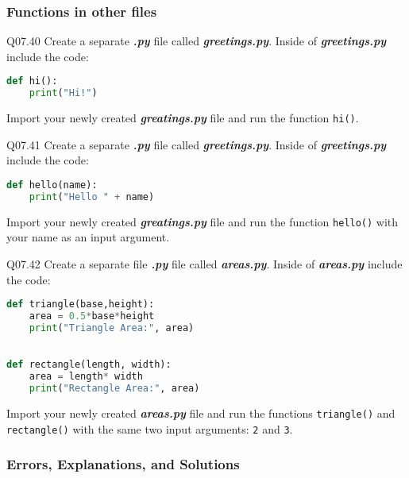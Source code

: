 \documentclass{book}
\newenvironment{problems}{}{}  %
\newcommand{\passthrough}[1]{#1}
\begin{document}
    
        \begin{problems}
        \hypertarget{functions-in-other-files}{%
\subsubsection{Functions in other
files}\label{functions-in-other-files}}

Q07.40 Create a separate \textbf{\emph{.py}} file called
\textbf{\emph{greetings.py}}. Inside of \textbf{\emph{greetings.py}}
include the code:

\begin{lstlisting}[language=Python]
def hi():
    print("Hi!")
\end{lstlisting}

Import your newly created \textbf{\emph{greatings.py}} file and run the
function \passthrough{\lstinline!hi()!}.

Q07.41 Create a separate \textbf{\emph{.py}} file called
\textbf{\emph{greetings.py}}. Inside of \textbf{\emph{greetings.py}}
include the code:

\begin{lstlisting}[language=Python]
def hello(name):
    print("Hello " + name)
\end{lstlisting}

Import your newly created \textbf{\emph{greatings.py}} file and run the
function \passthrough{\lstinline!hello()!} with your name as an input
argument.

Q07.42 Create a separate file \textbf{\emph{.py}} file called
\textbf{\emph{areas.py}}. Inside of \textbf{\emph{areas.py}} include the
code:

\begin{lstlisting}[language=Python]
def triangle(base,height):
    area = 0.5*base*height
    print("Triangle Area:", area)
    

def rectangle(length, width):
    area = length* width
    print("Rectangle Area:", area)
\end{lstlisting}

Import your newly created \textbf{\emph{areas.py}} file and run the
functions \passthrough{\lstinline!triangle()!} and
\passthrough{\lstinline!rectangle()!} with the same two input arguments:
\passthrough{\lstinline!2!} and \passthrough{\lstinline!3!}.
        \end{problems}

    




    
        \hypertarget{errors-explanations-and-solutions}{%
\subsubsection{Errors, Explanations, and
Solutions}\label{errors-explanations-and-solutions}}
\end{document}
